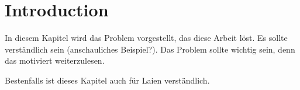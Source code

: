 \chapter{Introduction}\label{sec:intro}

In diesem Kapitel wird das Problem vorgestellt, das diese Arbeit löst.
Es sollte verständlich sein (anschauliches Beispiel?).
Das Problem sollte wichtig sein,
denn das motiviert weiterzulesen.

Bestenfalls ist dieses Kapitel auch für Laien verständlich.

